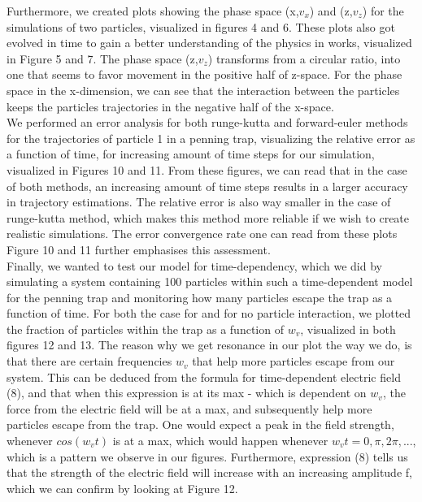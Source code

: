 \documentclass[english,notitlepage,reprint,nofootinbib,twocolumn]{article}
\begin{document}
Furthermore, we created plots showing the phase space (x,$v_x$) and (z,$v_z$) for the simulations of two particles, visualized in figures 4 and 6. These plots also got evolved in time to gain a better understanding of the physics in works, visualized in Figure 5 and 7. The phase space (z,$v_z$) transforms from a circular ratio, into one that seems to favor movement in the positive half of z-space. For the phase space in the x-dimension, we can see that the interaction between the particles keeps the particles trajectories in the negative half of the x-space. \\

We performed an error analysis for both runge-kutta and forward-euler methods for the trajectories of particle 1 in a penning trap, visualizing the relative error as a function of time, for increasing amount of time steps for our simulation, visualized in Figures 10 and 11. From these figures, we can read that in the case of both methods, an increasing amount of time steps results in a larger accuracy in trajectory estimations. The relative error is also way smaller in the case of runge-kutta method, which makes this method more reliable if we wish to create realistic simulations. The error convergence rate one can read from these plots Figure 10 and 11 further emphasises this assessment. \\

Finally, we wanted to test our model for time-dependency, which we did by simulating a system containing 100 particles within such a time-dependent model for the penning trap and monitoring how many particles escape the trap as a function of time. For both the case for and for no particle interaction, we plotted the fraction of particles within the trap as a function of $w_v$, visualized in both figures 12 and 13. The reason why we get resonance in our plot the way we do, is that there are certain frequencies $w_v$ that help more particles escape from our system. This can be deduced from the formula for time-dependent electric field (8), and that when this expression is at its max - which is dependent on $w_v$, the force from the electric field will be at a max, and subsequently help more particles escape from the trap. One would expect a peak in the field strength, whenever $cos(w_vt)$ is at a max, which would happen whenever $w_vt=0,\pi, 2\pi, ...$, which is a pattern we observe in our figures. Furthermore, expression (8) tells us that the strength of the electric field will increase with an increasing amplitude f, which we can confirm by looking at Figure 12. \\
\end{document}
